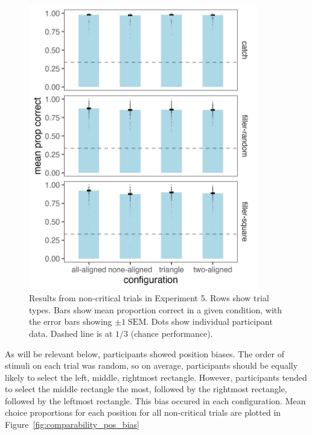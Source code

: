 \begin{figure}
   \includegraphics[width=100mm]{figures/non_crit_mean_prop_correct.jpeg}
   \caption{Results from non-critical trials in Experiment 5. Rows show trial types. Bars show mean proportion correct in a given condition, with the error bars showing $\pm1\;\text{SEM}$. Dots show individual participant data. Dashed line is at $1/3$ (chance performance).}
   \label{fig:comparability_non_crit_mean_prop_correct}
\end{figure}

As will be relevant below, participants showed position biases. The order of stimuli on each trial was random, so on average, participants should be equally likely to select the left, middle, rightmost rectangle. However, participants tended to select the middle rectangle the most, followed by the rightmost rectangle, followed by the leftmost rectangle. This bias occured in each configuration. Mean choice proportions for each position for all non-critical trials are plotted in Figure~\ref{fig:comparability_pos_bias}

